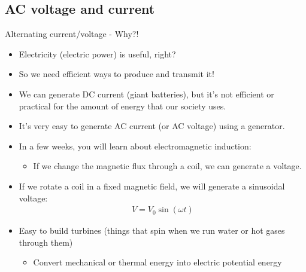 \documentclass[aspectratio=169,
hyperref={colorlinks,urlcolor=blue}
]{beamer}
\begin{document}



\subsection{AC voltage and current}
\label{subsection:ac}
\begin{frame}{Alternating current/voltage - Why?!}
\begin{itemize}
\item Electricity (electric power) is useful, right?
\item So we need efficient ways to produce and transmit it!
\item We can generate DC current (giant batteries), but it’s not efficient or practical for the amount of energy that our society uses.
\item It’s very easy to generate AC current (or AC voltage) using a generator.
\end{itemize}

\end{frame}


{
\begin{itemize}
\item In a few weeks, you will learn about electromagnetic induction:
\begin{itemize}
\item If we change the magnetic flux through a coil, we can generate a voltage.
\end{itemize}
\item If we rotate a coil in a fixed magnetic field, we will generate a sinusoidal voltage:
\begin{align*}
V = V_0\sin(\omega t)
\end{align*}
\item Easy to build turbines (things that spin when we run water or hot gases through
them)
\begin{itemize}
\item Convert mechanical or thermal energy into electric potential energy
\end{itemize} 
\end{itemize}
}
{
\vspace{-1cm}

\vspace{-1cm}

}
\end{document}
